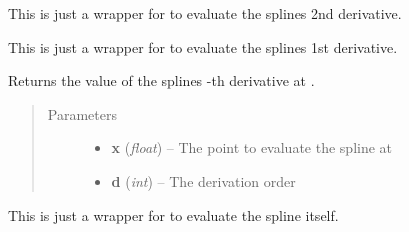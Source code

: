 \documentclass[letterpaper,10pt,english]{sphinxmanual}
\begin{document}
\begin{fulllineitems}
\begin{fulllineitems}
\end{fulllineitems}


\begin{fulllineitems}
\label{pytrajectory:pytrajectory.spline.CubicSpline.ddf}
This is just a wrapper for {\hyperref[pytrajectory:pytrajectory.spline.CubicSpline.evalf]{}} to evaluate the splines 2nd derivative.

\end{fulllineitems}


\begin{fulllineitems}
\label{pytrajectory:pytrajectory.spline.CubicSpline.df}
This is just a wrapper for {\hyperref[pytrajectory:pytrajectory.spline.CubicSpline.evalf]{}} to evaluate the splines 1st derivative.

\end{fulllineitems}


\begin{fulllineitems}
\label{pytrajectory:pytrajectory.spline.CubicSpline.evalf}
Returns the value of the splines -th derivative at .
\begin{quote}\begin{description}
\item[{Parameters}] \leavevmode\begin{itemize}
\item {} 
\textbf{x} (\emph{float}) -- The point to evaluate the spline at

\item {} 
\textbf{d} (\emph{int}) -- The derivation order

\end{itemize}

\end{description}\end{quote}

\end{fulllineitems}


\begin{fulllineitems}
\label{pytrajectory:pytrajectory.spline.CubicSpline.f}
This is just a wrapper for {\hyperref[pytrajectory:pytrajectory.spline.CubicSpline.evalf]{}} to evaluate the spline itself.


\end{fulllineitems}
\end{fulllineitems}
\end{document}
